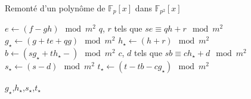 \begin{algorithm}
  \caption{Remonté d'un polynôme de $\mathbb{F}_p[x]$ dans $\mathbb{F}_{p^2}[x]$}
  \label{alg:step}  
  \begin{algorithmic}[1]
    \Statex

    \State   $e \gets (f - gh) \mod m^2$
    \State $q$, $r$ tels que $se \equiv qh + r \mod m^2$
    \State $g_{\star} \gets (g+te+qg) \mod m^2$
    \State $h_{\star} \gets (h+r) \mod m^2$
    \State $b \gets (sg_{\star} + th_{\star} -) \mod m^2$
    \State $c$, $d$ tels que $sb \equiv ch_{\star} + d \mod m^2$
    \State $s_{\star} \gets (s-d) \mod m^2$
    \State $t_{\star} \gets (t-tb-cg_{\star}) \mod m^2$

    \State \Return $g_{\star}$,$h_{\star}$,$s_{\star}$,$t_{\star}$
    \EndFunction
  \end{algorithmic}
\end{algorithm}
